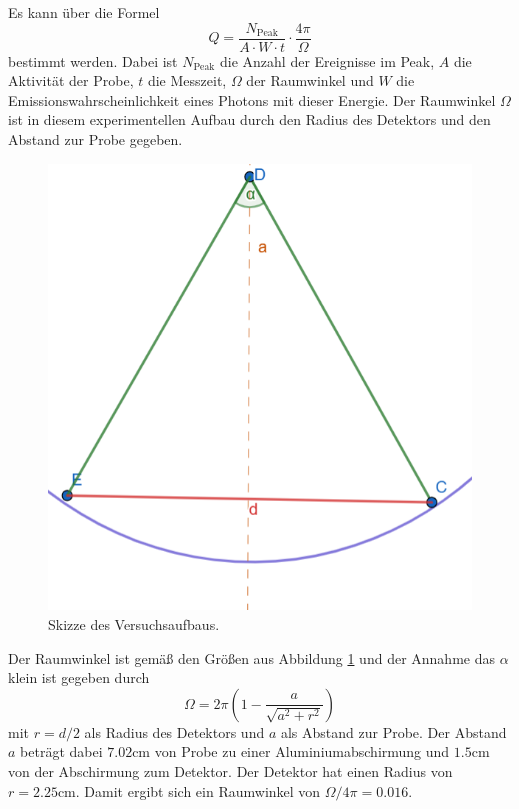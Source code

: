 Es kann über die Formel 
\begin{equation}
    \label{eq:Q}
    Q = \frac{N_{\text{Peak}}}{A\cdot W\cdot t}\cdot\frac{4\pi}{\Omega}
\end{equation}
bestimmt werden. Dabei ist $N_{\text{Peak}}$ die Anzahl der Ereignisse im Peak, $A$ die Aktivität der Probe, $t$ die Messzeit, $\Omega$ der Raumwinkel und $W$ die Emissionswahrscheinlichkeit eines Photons mit dieser Energie.
Der Raumwinkel $\Omega$ ist in diesem experimentellen Aufbau durch den Radius des Detektors und den Abstand zur Probe gegeben.
\begin{figure}[H]
    \centering
    \includegraphics[scale=0.6]{illustration/Raumwinkel.png}
    \caption{Skizze des Versuchsaufbaus.}
    \label{fig:Raumwinkel}
\end{figure}
\noindent Der Raumwinkel ist gemäß den Größen aus Abbildung \ref{fig:Raumwinkel} und der Annahme das $\alpha$ klein ist gegeben durch
\begin{equation}
    \label{eq:Raumwinkel}
    \Omega = 2\pi\left(1-\frac{a}{\sqrt{a^2+r^2}}\right)
\end{equation}
mit $r=d/2$ als Radius des Detektors und $a$ als Abstand zur Probe. Der Abstand $a$ beträgt dabei $7.02\si{\centi\meter}$ von Probe zu einer Aluminiumabschirmung
und $1.5\si{\centi\meter}$ von der Abschirmung zum Detektor. Der Detektor hat einen Radius von $r=2.25\si{\centi\meter}$.
Damit ergibt sich ein Raumwinkel von $\Omega/4\pi=0.016$.
